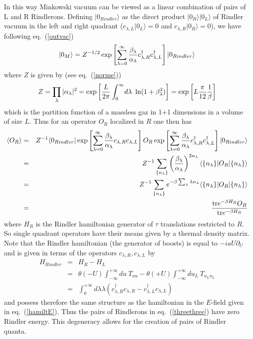 \documentclass[12pt,oneside]{report}
\def\ket#1{|#1\rangle}
\def\bra#1{\langle #1|}
\def\elematrice#1#2#3{\langle #1|#2|#3 \rangle}
\def\la{\lambda}
\begin{document}
In this way Minkowski vacuum can be viewed as a linear combination of pairs
of L and R Rindlerons. Defining $\ket{0_{Rindler}}$ as the direct product 
$\ket{0_R} \ket{0_L}$ of Rindler vacuum in the left and right quadrant
($c_{\la,L}\ket{0_L} =0$ and $c_{\la,R}\ket{0_R} =0$), we have following 
eq.~(\ref{outvac})
\begin{equation}
\ket{0_M} = Z^{-1/2} \exp \left [ \sum_{\la=0}^\infty {\beta_\la \over
\alpha_\la} c_{\la,R}^\dagger c_{\la,L}^\dagger \right]\ket{0_{Rindler}}
\label{threethree}
\end{equation}
where $Z$ is given by (see eq.~(\ref{norme}))
\begin{equation}
Z= \prod _\la \vert \alpha_\la \vert^2 
= \exp \left[{L \over 2 \pi} \int_0^{\infty}\! d\la \ \ln (1 + \beta_\la^2)
\right]=\exp \left[ L{\pi \over 12} {1 \over \beta}\right]
\label{partf}
\end{equation}
which is the partition function of a massless gaz in 1+1 dimensions in 
a  volume of size $L$.
Thus for an operator $O_R$ localized in $R$ one then has
\begin{eqnarray}
 \langle O_R \rangle &=& Z^{-1} 
\bra{0_{Rindler}} \exp \left[{ \sum_{\la=0}^\infty {\beta_\la \over
\alpha_\la} c_{\la,R} c_{\la,L}} \right] O_R
\exp \left [{ \sum_{\la=0}^\infty {\beta_\la \over \alpha_\la}
c_{\la,R}^\dagger c_{\la,L}^\dagger} \right] \ket{0_{Rindler}}
\nonumber\\
&=& Z^{-1}\sum_{ \{ n_\la \} }
\left( \beta_{\la} \over \alpha_{\la} \right)^{2 n_{\la}}
 \elematrice{\{ n_{\la} \}}{ O_R }{\{ n_{\la} \}}\nonumber\\
&=& Z^{-1} \sum_{ \{ n_\la \} }
e^{-\beta \sum_\la  \la n_\la  } 
\elematrice{\{ n_\la \}}{ O_R }{\{ n_\la \}}
\nonumber\\
&=& { {\rm tr} e^{-\beta H_R} O_R \over {\rm tr} e^{-\beta H_R}}
\label{threefour}
\end{eqnarray}
where $H_R$ is the Rindler hamiltonian generator of $\tau$ translations
restricted to $R$.
So single quadrant operators have their means given by a thermal density
matrix. 
Note that the Rindler hamiltonian (the generator of boosts)
is equal to $-i aU \partial_U $  and is given
in terms of the operators $c_{\la,R}, c_{\la,L}$ by
\begin{eqnarray}
H_{Rindler} &=& H_R - H_L \nonumber\\
&=& \theta(-U) \int_{-\infty}^{+\infty} \! du\ T_{uu}
-  \theta(+U) \int_{-\infty}^{+\infty} \! du_L\ T_{u_Lu_L}
\nonumber \\
&=& \int^{+\infty}_0 d\la \la (c_{\la,R}^{\dagger} c_{\la,R} - 
c_{\la,L}^{\dagger} c_{\la,L} )
\label{hamr}
\end{eqnarray}
and possess therefore the same structure as the hamiltonian in the $E$-field
given in eq.~(\ref{hamiltE}). Thus the  pairs of
Rindlerons in eq.~(\ref{threethree}) have zero Rindler energy. This degeneracy
allows for the  creation of pairs of Rindler quanta.
\end{document}
